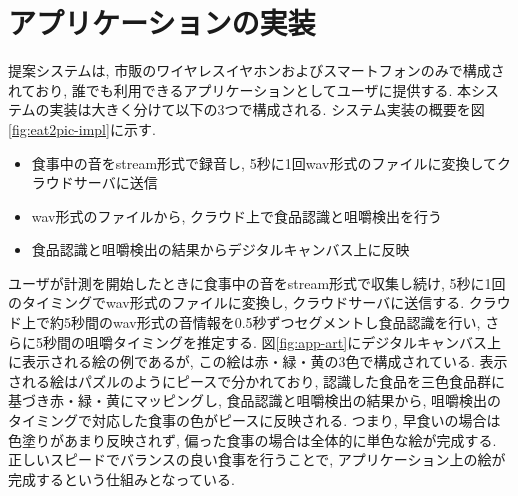 \section{アプリケーションの実装}

提案システムは, 市販のワイヤレスイヤホンおよびスマートフォンのみで構成されており, 誰でも利用できるアプリケーションとしてユーザに提供する. 本システムの実装は大きく分けて以下の3つで構成される. システム実装の概要を図\ref{fig:eat2pic-impl}に示す.

\begin{itemize}
    \item 食事中の音をstream形式で録音し, 5秒に1回wav形式のファイルに変換してクラウドサーバに送信
    \item wav形式のファイルから, クラウド上で食品認識と咀嚼検出を行う
    \item 食品認識と咀嚼検出の結果からデジタルキャンバス上に反映
\end{itemize}

ユーザが計測を開始したときに食事中の音をstream形式で収集し続け, 5秒に1回のタイミングでwav形式のファイルに変換し, クラウドサーバに送信する. クラウド上で約5秒間のwav形式の音情報を0.5秒ずつセグメントし食品認識を行い, さらに5秒間の咀嚼タイミングを推定する. 図\ref{fig:app-art}にデジタルキャンバス上に表示される絵の例であるが, この絵は赤・緑・黄の3色で構成されている. 表示される絵はパズルのようにピースで分かれており, 認識した食品を三色食品群に基づき赤・緑・黄にマッピングし, 食品認識と咀嚼検出の結果から, 咀嚼検出のタイミングで対応した食事の色がピースに反映される. つまり, 早食いの場合は色塗りがあまり反映されず, 偏った食事の場合は全体的に単色な絵が完成する. 正しいスピードでバランスの良い食事を行うことで, アプリケーション上の絵が完成するという仕組みとなっている.

